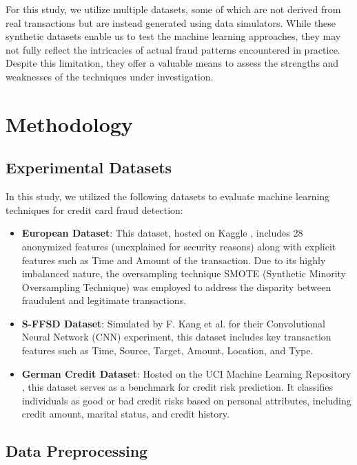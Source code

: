 \documentclass{article}
\begin{document}
For this study, we utilize multiple datasets, some of which are not derived from real transactions but are instead generated using data simulators. While these synthetic datasets enable us to test the machine learning approaches, they may not fully reflect the intricacies of actual fraud patterns encountered in practice. Despite this limitation, they offer a valuable means to assess the strengths and weaknesses of the techniques under investigation.

\section{Methodology}

\subsection{Experimental Datasets}

In this study, we utilized the following datasets to evaluate machine learning techniques for credit card fraud detection:

\begin{itemize}
    \item \textbf{European Dataset}: This dataset, hosted on Kaggle \cite{kaggle_european}, includes 28 anonymized features (unexplained for security reasons) along with explicit features such as Time and Amount of the transaction. Due to its highly imbalanced nature, the oversampling technique SMOTE (Synthetic Minority Oversampling Technique) \cite{chawla2002smote} was employed to address the disparity between fraudulent and legitimate transactions.

    \item \textbf{S-FFSD Dataset}: Simulated by F. Kang et al\cite{kang2018sffsd}. for their Convolutional Neural Network (CNN) experiment, this dataset includes key transaction features such as Time, Source, Target, Amount, Location, and Type.

    \item \textbf{German Credit Dataset}: Hosted on the UCI Machine Learning Repository \cite{uci_german}, this dataset serves as a benchmark for credit risk prediction. It classifies individuals as good or bad credit risks based on personal attributes, including credit amount, marital status, and credit history. 
\end{itemize}

\subsection{Data Preprocessing}
\end{document}
